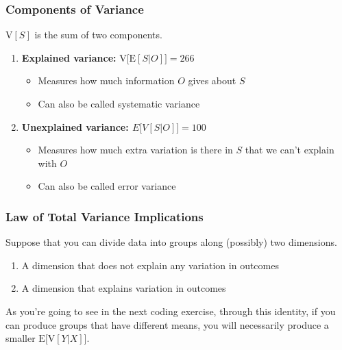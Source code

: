 \documentclass[12pt, block=fill]{beamer}
\newcommand{\E}{\text{E}}
\newcommand{\V}{\text{V}}
\begin{document}
 \begin{frame}
   \frametitle{Components of Variance}
   $\V[S]$ is the sum of two components.
   \begin{enumerate}
   \item \textbf{Explained variance:} $\V\big[\E[S|O]\big] = 266$
     \begin{itemize}
     \item Measures how much information $O$ gives about $S$
     \item Can also be called systematic variance
     \end{itemize}

     \pause

   \item \textbf{Unexplained variance: $E\big[V[S|O]\big]=100$}
     \begin{itemize}
     \item Measures how much extra variation is there in $S$ that we
       can't explain with $O$
     \item Can also be called error variance
     \end{itemize}
   \end{enumerate}
 \end{frame}

 \begin{frame}
   \frametitle{Law of Total Variance Implications}
   Suppose that you can divide data into groups along (possibly) two
   dimensions.
   \begin{enumerate}
   \item A dimension that does not explain any variation in outcomes
   \item A dimension that explains variation in outcomes
   \end{enumerate}

   As you're going to see in the next coding exercise, through this
   identity, if you can produce groups that have different means, you
   will necessarily produce a smaller $\E\big[\V[Y|X]\big]$.
 \end{frame}
\end{document}

